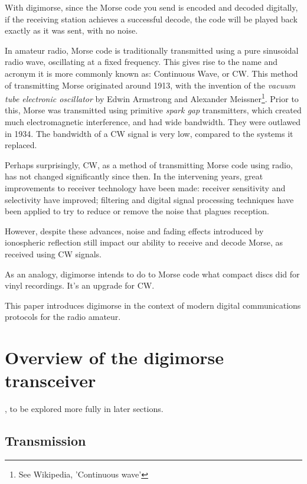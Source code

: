 \documentclass[a4paper]{tufte-handout}
\begin{document}
    With digimorse, since the Morse code you send is encoded and decoded digitally, if the receiving station
    achieves a successful decode, the code will be played back exactly as it was sent, with no noise.

    In amateur radio, Morse code is traditionally transmitted using a pure sinusoidal radio wave, oscillating at a
    fixed frequency. This gives rise to the name and acronym it is more commonly known as: Continuous Wave, or CW.
    This method of transmitting Morse originated around 1913, with the invention of the \emph{vacuum tube electronic
    oscillator} by Edwin Armstrong and Alexander Meissner\footnote{See Wikipedia, 'Continuous wave'}. Prior to this,
    Morse was transmitted using primitive \emph{spark gap} transmitters, which created much electromagnetic
    interference, and had wide bandwidth. They were outlawed in 1934. The bandwidth of a CW signal is very low,
    compared to the systems it replaced\cite{Amos}.

	\pagebreak
    Perhaps surprisingly, CW, as a method of transmitting Morse code
    using radio, has not changed significantly since then. In the intervening years, great improvements to receiver
    technology have been made: receiver sensitivity and selectivity have improved; filtering and digital signal
    processing techniques have been applied to try to reduce or remove the noise that plagues reception.

    However, despite these advances, noise and fading effects introduced by ionospheric reflection still impact our
    ability to receive and decode Morse, as received using CW signals.

    As an analogy, digimorse intends to do to Morse code what compact discs did for vinyl recordings. It's an upgrade
    for CW.

    This paper introduces digimorse in the context of modern digital communications protocols for the radio amateur.

    \pagebreak
    \tableofcontents
    \pagebreak

\section{Overview of the digimorse transceiver}
    , to be explored more fully in later sections.

\subsection{Transmission}
\end{document}
